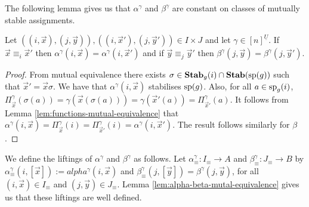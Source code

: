 \documentclass[../paper.tex]{subfiles}
\begin{document}


The following lemma gives us that $\alpha^{\gamma}$ and $\beta^{\gamma}$ are
constant on classes of mutually stable assignments.

\begin{lem}
  Let $((i, \vec{x}), (j, \vec{y})), ((i, \vec{x}'), (j, \vec{y}')) \in I \times
  J$ and let $\gamma \in [n]^{\underline{U}}$. If $\vec{x} \equiv_i \vec{x}'$
  then $\alpha^{\gamma}(i, \vec{x}) = \alpha^{\gamma}(i, \vec{x}')$ and if
  $\vec{y} \equiv_j \vec{y}'$ then $\beta^{\gamma}(j, \vec{y}) =
  \beta^{\gamma}(j, \vec{y}')$.
  \label{lem:alpha-beta-mutal-equivalence}
\end{lem}
\begin{proof}
  From mutual equivalence there exists $\sigma \in \text{\textbf{Stab}}_g(i) \cap \text{\textbf{Stab}} (\text{sp} (g))$
  such that $\vec{x}' = \vec{x} \sigma$. We have that $\alpha^{\gamma}(i,
  \vec{x})$ stabilises $\text{sp}(g)$. Also, for all $a \in \text{sp}_g(i)$,
  $\Pi^{\gamma}_{\vec{x}} (\sigma (a)) = \gamma (\vec{x}(\sigma (a))) = \gamma
  (\vec{x}'(a)) = \Pi^{\gamma}_{\vec{x}'}(a)$. It follows from Lemma
  \ref{lem:functions-mutual-equivalence} that $\alpha^{\gamma}(i,\vec{x}) =
  \Pi^{\gamma}_{\vec{x}} (i) = \Pi^{\gamma}_{\vec{x}'}(i) = \alpha^{\gamma}(i,
  \vec{x}')$. The result follows similarly for $\beta$.
\end{proof}

We define the liftings of $\alpha^{\gamma}$ and $\beta^{\gamma}$ as follows. Let
$\alpha^{\gamma}_{\equiv} : I_\equiv \rightarrow A$ and $\beta^{\gamma}_\equiv:
J_\equiv \rightarrow B$ by $\alpha^{\gamma}_{\equiv}(i, [\vec{x}]) :=
alpha^{\gamma} (i, \vec{x})$ and $\beta^{\gamma}_{\equiv}(j, [\vec{y}]) =
\beta^{\gamma} (j, \vec{y})$, for all $(i, \vec{x}) \in I_{\equiv}$ and $(j,
\vec{y}) \in J_\equiv$. Lemma \ref{lem:alpha-beta-mutal-equivalence} gives us
that these liftings are well defined.
\end{document}
